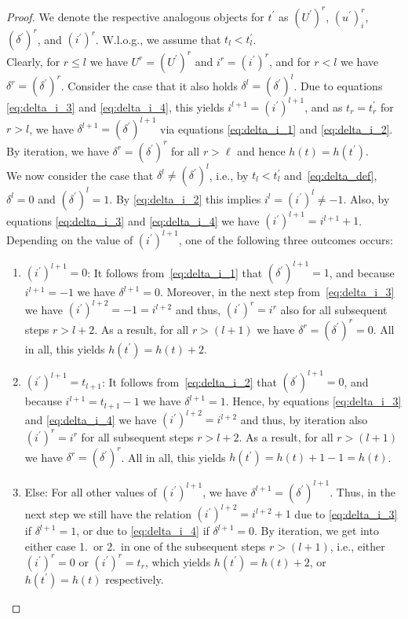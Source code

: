\documentclass[a4paper,
               10pt,
               pdftex,
               normalheadings,
               headsepline,
               footsepline,
               headinclude,
               footinclude,
               DIV=14,
               abstracton]
{scrartcl}
\newcommand{\ldif}{l}
\begin{document}
\begin{proof}
We denote the respective analogous objects for $t^\prime$ as $(U^\prime)^r$, $(u^\prime)_i^r$, $ (\delta^\prime)^r $, and $(i^\prime)^r$.
W.l.o.g., we assume that $t_\ldif < t_\ldif^\prime$. \\
Clearly, for $r \leq \ldif$ we have $U^r = (U^\prime)^r$ and $i^r = (i^\prime)^r$, and for $r < \ldif$ we have $\delta^{r} = (\delta^\prime)^{r}$.
Consider the case that it also holds $\delta^{\ldif} = (\delta^\prime)^{\ldif}$. Due to equations \eqref{eq:delta_i_3} and \eqref{eq:delta_i_4}, this yields $i^{\ldif+1} = (i^\prime)^{\ldif+1}$, and as $t_r = t^\prime_r$ for $r>\ldif$, we have $\delta^{\ldif + 1} = (\delta^\prime)^{\ldif + 1}$ via equations \eqref{eq:delta_i_1} and \eqref{eq:delta_i_2}. By iteration, we have $\delta^r = (\delta^\prime)^{r}$ for all $r>\ell$ and hence $h(t) = h(t^\prime)$.\\
We now consider the case that $\delta^{\ldif} \neq (\delta^\prime)^{\ldif}$, i.e., by $t_\ldif < t_\ldif^\prime$ and~\eqref{eq:delta_def}, $\delta^{\ldif}=0$ and $(\delta^\prime)^{\ldif}=1$. By \eqref{eq:delta_i_2} this implies $i^\ldif = (i^\prime)^{\ldif} \neq -1$.
Also, by equations \eqref{eq:delta_i_3} and \eqref{eq:delta_i_4} we have $(i^\prime)^{\ldif + 1}= i^{\ldif + 1} + 1$.
Depending on the value of $(i^\prime)^{\ldif + 1}$, one of the following three outcomes occurs:
\begin{enumerate}
    \item
    $(i^\prime)^{\ldif + 1} = 0$: It follows from~\eqref{eq:delta_i_1} that $(\delta^\prime)^{\ldif + 1} = 1$, and because $i^{\ldif + 1} = -1$ we have $\delta^{\ldif + 1} = 0$.
    Moreover, in the next step from~\eqref{eq:delta_i_3} we have $(i^\prime)^{\ldif + 2} = -1 = i^{\ldif + 2}$ and thus, $(i^\prime)^{r} = i^{r}$ also for all subsequent steps $r > \ldif + 2$.
    As a result, for all $r > (\ldif + 1)$ we have $\delta^r = (\delta^\prime)^{r}=0$.
    All in all, this yields $h(t^\prime) = h(t) + 2$.
    \item
    $(i^\prime)^{\ldif + 1} = t_{\ldif +1}$: It follows from~\eqref{eq:delta_i_2} that $(\delta^\prime)^{\ldif + 1} = 0$, and because $i^{\ldif + 1} = t_{\ldif +1} - 1$ we have $\delta^{\ldif + 1} = 1$.
    Hence, by equations \eqref{eq:delta_i_3} and \eqref{eq:delta_i_4} we have $(i^\prime)^{\ldif + 2} = i^{\ldif + 2}$ and thus, by iteration also $(i^\prime)^{r} = i^{r}$ for all subsequent steps $r > \ldif + 2$.
    As a result, for all $r > (\ldif + 1)$ we have $\delta^r = (\delta^\prime)^{r}$.
    All in all, this yields $h(t^\prime) = h(t) + 1 - 1 = h(t)$.
    \item
    Else: For all other values of $(i^\prime)^{\ldif + 1}$, we have $\delta^{\ldif + 1} = (\delta^\prime)^{\ldif + 1}$. Thus, in the next step we still have the relation $(i^\prime)^{\ldif + 2}= i^{\ldif + 2} + 1$ due to \eqref{eq:delta_i_3} if $\delta^{\ldif + 1} = 1$, or due to \eqref{eq:delta_i_4} if $\delta^{\ldif + 1} = 0$.
    By iteration, we get into either case 1.\ or 2.\ in one of the subsequent steps $r > (\ldif + 1)$, i.e., either $(i^\prime)^{r} = 0$ or $(i^\prime)^{r} = t_{r}$, which yields $h(t^\prime) = h(t) + 2$, or $h(t^\prime) = h(t)$ respectively.
\end{enumerate}
\end{proof}
\end{document}

